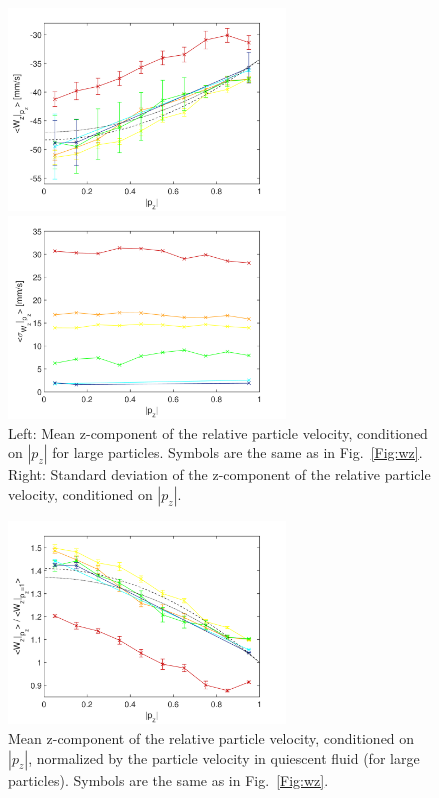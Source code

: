 \documentclass[]{jfm}
\begin{document}
\begin{figure}
\centering
\begin{minipage}{.5\textwidth}
  \centering
  \includegraphics[width=2.9in]{figures/wz-U-large.pdf}
\end{minipage}%
\begin{minipage}{.5\textwidth}
  \centering
  \includegraphics[width=2.9in]{figures/wz-U-sigma-large.pdf}
\end{minipage}
\caption{Left: Mean z-component of the relative particle velocity, conditioned on $|p_z|$ for large particles. Symbols are the same as in Fig.~\ref{Fig:wz}. Right: Standard deviation of the z-component of the relative particle velocity, conditioned on $|p_z|$.}
\label{Fig:wz-large}
\end{figure}

\begin{figure}
\centering
  \includegraphics[width=2.9in]{figures/wz-U-norm-large.pdf}
\caption{Mean z-component of the relative particle velocity, conditioned on $|p_z|$, normalized by the particle velocity in quiescent fluid (for large particles). Symbols are the same as in Fig.~\ref{Fig:wz}.}
\label{Fig:wz-norm-large}
\end{figure}
\end{document}
